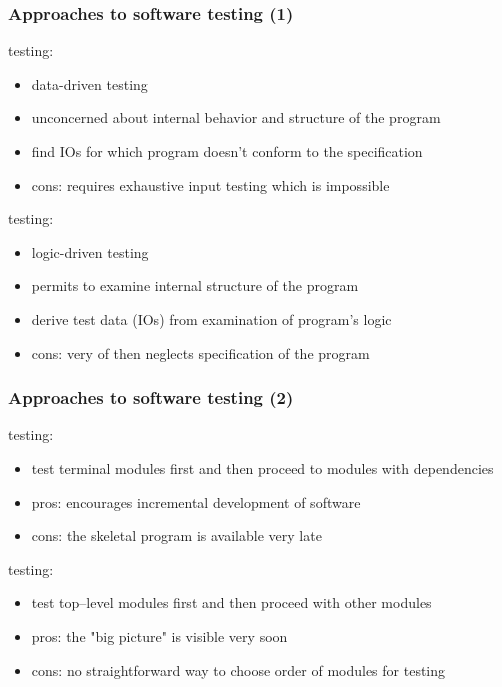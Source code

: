 \documentclass{beamer}
\begin{document}
\begin{frame}[fragile]
    \frametitle{Approaches to software testing (1)}

     testing:
    \begin{itemize}
        \item data-driven testing
        \item unconcerned about internal behavior and structure of the program
        \item find IOs for which program doesn't conform to the specification
        \item {\color{red} cons}: requires exhaustive input testing which is impossible
    \end{itemize}
    \pause
     testing:
    \begin{itemize}
        \item logic-driven testing
        \item permits to examine internal structure of the program
        \item derive test data (IOs) from examination of program's logic
        \item {\color{red} cons}: very of then neglects specification of the program
    \end{itemize}
\end{frame}

\begin{frame}[fragile]
    \frametitle{Approaches to software testing (2)}

     testing:
    \begin{itemize}
        \item test terminal modules first and then proceed to modules with dependencies
        \item {\color{green} pros}: encourages incremental development of software
        \item {\color{red} cons}: the skeletal program is available very late
    \end{itemize}
    \pause
     testing:
    \begin{itemize}
        \item test top--level modules first and then proceed with other modules
        \item {\color{green} pros}: the "big picture" is visible very soon
        \item {\color{red} cons}: no straightforward way to choose order of modules for testing
    \end{itemize}
\end{frame}
\end{document}
